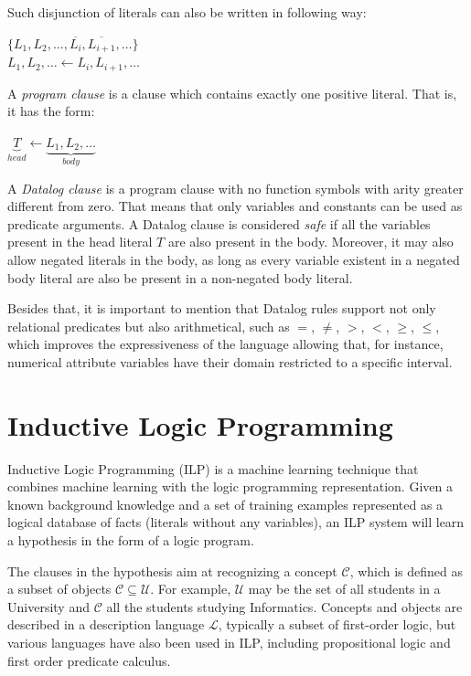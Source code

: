 Such disjunction of literals can also be written in following way:
\begin{center}
 $\{L_1,L_2,\ldots,\overline{L_i},\overline{L_{i+1}},\ldots\}$ \\
$ L_1,L_2,\ldots \leftarrow L_i,L_{i+1},\ldots$
\end{center}

A \emph{program clause} is a clause which contains exactly one positive literal. That is, it has the form:
\begin{center}
 $\underbrace{T}_{head} \leftarrow \underbrace{L_1,L_2,\ldots}_{body}$
\end{center}

A \emph{Datalog clause} is a program clause with no function symbols with arity greater different from zero. That
means that only variables and constants can be used as predicate arguments. A Datalog clause is considered \emph{safe}
if all the variables present in the head literal $T$ are also present in the body. Moreover, it may also allow negated
literals in the body, as long as every variable existent in a negated body literal are also be present in a
non-negated body literal.

Besides that, it is important to mention that Datalog rules support not only relational predicates but also
arithmetical, such as $=$, $\neq$, $>$, $<$, $\geq$, $\leq$, which improves the expressiveness of the language
allowing that, for instance, numerical attribute variables have their domain restricted to a specific interval.

\section{Inductive Logic Programming}
\label{sec:rw-ilp}

Inductive Logic Programming (ILP) is a machine learning technique that combines machine learning with the
logic programming representation. Given a known background knowledge and a set of training examples represented as a
logical database of facts (literals without any variables), an ILP system will learn a hypothesis in the form of a
logic program.

The clauses in the hypothesis aim at recognizing a concept $\mathcal{C}$, which is defined as a subset of objects
$\mathcal{C} \subseteq \mathcal{U}$. For example, $\mathcal{U}$ may be the set of all students in a University and
$\mathcal{C}$ all the students studying Informatics.
Concepts and objects are described in a description language $\mathcal{L}$, typically a subset of first-order logic,
but
various languages have also been used in ILP, including propositional logic and first order predicate calculus.


